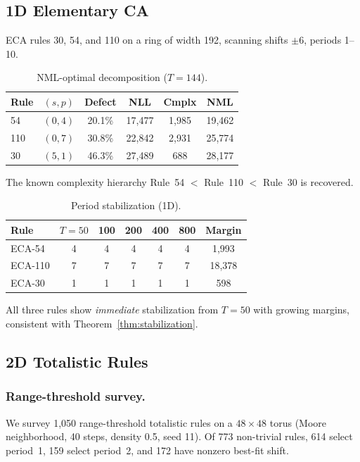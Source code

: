 \documentclass[letterpaper]{article}
\theoremstyle{definition}
\theoremstyle{remark}
\begin{document}
\subsection{1D Elementary CA}

ECA rules 30, 54, and 110 on a ring of width 192, scanning shifts $\pm 6$, periods 1--10.

\begin{table}[!htb]
\centering
\caption{NML-optimal decomposition ($T = 144$).}\label{tab:1d-nml}
\begin{tabular}{lccccc}
\toprule
Rule & $(s, p)$ & Defect & NLL & Cmplx & NML \\
\midrule
54  & $(0, 4)$ & 20.1\% & 17{,}477 & 1{,}985 & 19{,}462 \\
110 & $(0, 7)$ & 30.8\% & 22{,}842 & 2{,}931 & 25{,}774 \\
30  & $(5, 1)$ & 46.3\% & 27{,}489 & 688     & 28{,}177 \\
\bottomrule
\end{tabular}
\end{table}

The known complexity hierarchy Rule~54 $<$ Rule~110 $<$ Rule~30 \citep{crutchfield1997,redeker2017} is recovered.

\begin{table}[!htb]
\centering
\caption{Period stabilization (1D).}\label{tab:1d-stab}
\begin{tabular}{lcccccc}
\toprule
Rule & $T{=}50$ & 100 & 200 & 400 & 800 & Margin \\
\midrule
ECA-54  & 4 & 4 & 4 & 4 & 4 & 1{,}993 \\
ECA-110 & 7 & 7 & 7 & 7 & 7 & 18{,}378 \\
ECA-30  & 1 & 1 & 1 & 1 & 1 & 598 \\
\bottomrule
\end{tabular}
\end{table}

All three rules show \emph{immediate} stabilization from $T{=}50$ with growing margins, consistent with Theorem~\ref{thm:stabilization}.

\subsection{2D Totalistic Rules}

\subsubsection{Range-threshold survey.}
We survey 1{,}050 range-threshold totalistic rules on a $48 \times 48$ torus (Moore neighborhood, 40 steps, density 0.5, seed 11).
Of 773 non-trivial rules, 614 select period~1, 159 select period~2, and 172 have nonzero best-fit shift.
\end{document}
